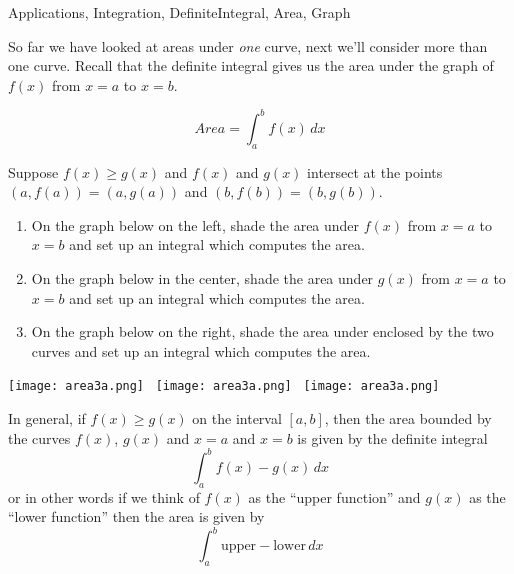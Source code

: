 \begin{tagblock}{Applications, Integration, DefiniteIntegral, Area, Graph}
\begin{question}
	


So far we have looked at areas under \emph{one} curve, next we'll consider more than one curve.  Recall that the definite integral gives us the area under the graph of $f(x)$ from $x=a$ to $x=b$.  

\[Area = \int_a^b f(x) \, dx\]



\item Suppose $f(x) \geq g(x)$ and $f(x)$ and $g(x)$ intersect at the points $(a,f(a)) = (a,g(a))$ and $(b,f(b)) = (b,g(b))$.  

\begin{enumerate}
\item On the graph below on the left, shade the area under $f(x)$ from $x=a$ to $x=b$ and set up an integral which computes the area.

\vspace{.75in}

\item On the graph below in the center, shade the area under $g(x)$ from $x=a$ to $x=b$ and set up an integral which computes the area.

\vspace{.75in}

\item On the graph below on the right, shade the area under enclosed by the two curves and set up an integral which computes the area.
\vspace{1in}

\end{enumerate}


\texttt{[image: area3a.png]} \, \texttt{[image: area3a.png]} \, \texttt{[image: area3a.png]} 

In general, if $f(x) \geq g(x)$ on the interval $[a,b]$, then the area bounded by the curves $f(x)$, $g(x)$ and $x=a$ and $x=b$ is given by the definite integral
\[ \int _a^b f(x) - g(x) \, dx \]
or in other words if we think of $f(x)$ as the ``upper function'' and $g(x)$ as the ``lower function'' then the area is given by 
\[ \int _a^b \text{upper} - \text{lower} \, dx \]


\end{question}
\end{tagblock}
